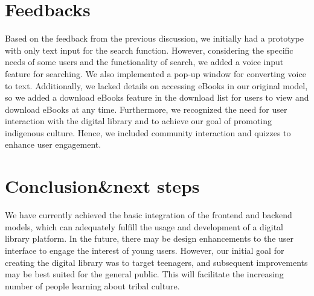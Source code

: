 \chapter{Feedbacks}
Based on the feedback from the previous discussion, we initially had a prototype with only text input for the search function. However, considering the specific needs of some users and the functionality of search, we added a voice input feature for searching. We also implemented a pop-up window for converting voice to text. Additionally, we lacked details on accessing eBooks in our original model, so we added a download eBooks feature in the download list for users to view and download eBooks at any time. Furthermore, we recognized the need for user interaction with the digital library and to achieve our goal of promoting indigenous culture. Hence, we included community interaction and quizzes to enhance user engagement.


\chapter{Conclusion\&next steps} 

We have currently achieved the basic integration of the frontend and backend models, which can adequately fulfill the usage and development of a digital library platform. In the future, there may be design enhancements to the user interface to engage the interest of young users. However, our initial goal for creating the digital library was to target teenagers, and subsequent improvements may be best suited for the general public. This will facilitate the increasing number of people learning about tribal culture.


